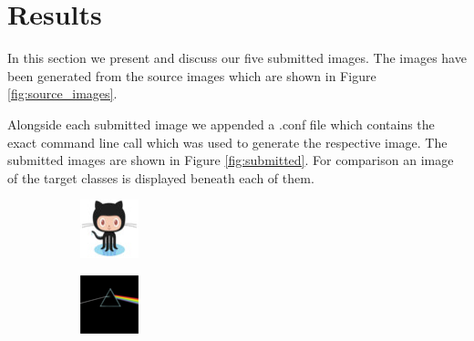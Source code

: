 
\section{Results}

In this section we present and discuss our five submitted images. The images have been generated from the source images which are shown in Figure \ref{fig:source_images}.

Alongside each submitted image we appended a .conf file which contains the exact command line call which was used to generate the respective image. The submitted images are shown in Figure \ref{fig:submitted}. For comparison an image of the target classes is displayed beneath each of them.

\begin{figure}
\centering
\begin{subfigure}{.19\linewidth}
  \centering
  \includegraphics[width=0.7\linewidth]{imgs/octocat}
\end{subfigure}
\begin{subfigure}{.19\linewidth}
  \centering
  \includegraphics[width=0.7\linewidth]{imgs/darkside}

\end{subfigure}
\end{figure}
